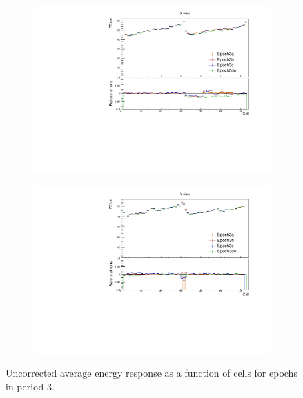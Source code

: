 \documentclass[12pt,a4paper]{article}
\begin{document}
\begin{figure}[!hbtp]
\centering
\begin{subfigure}[b]{0.495\textwidth}
\centering
\includegraphics[width=\textwidth]{Plots/Attenprofs_P3Data_CellPE_X_Combined.pdf}
\end{subfigure}
\begin{subfigure}[b]{0.495\textwidth}
\centering
\includegraphics[width=\textwidth]{Plots/Attenprofs_P3Data_CellPE_Y_Combined.pdf}
\end{subfigure}
\caption{Uncorrected average energy response as a function of cells for epochs in period 3.}
\label{figCalibhistCellPE_period3}
\end{figure}
\end{document}
